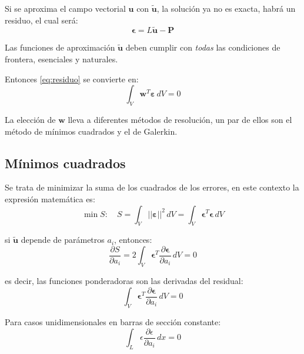 Si se aproxima el campo vectorial $\mathbf{u}$ con $\tilde{\mathbf{u}}$, la solución ya no es exacta, habrá un residuo, el cual será:
\begin{equation}
	\bm{\epsilon} = L \tilde{\mathbf{u}} - \mathbf{P}
\end{equation}

Las funciones de aproximación $\tilde{\mathbf{u}}$ deben cumplir con \textit{todas} las condiciones de frontera, esenciales y naturales.

Entonces \eqref{eq:residuo} se convierte en:
\begin{equation}
	\int_V \mathbf{w}^T \bm{\varepsilon} \, dV = 0
	\label{eq:pond}
\end{equation}

La elección de $\mathbf{w}$ lleva a diferentes métodos de resolución, un par de ellos son el método de mínimos cuadrados y el de Galerkin.

\subsection{Mínimos cuadrados}
Se trata de minimizar la suma de los cuadrados de los errores, en este contexto la expresión matemática es:
\begin{equation}
	\min S: \quad S = \int_V ||\bm{\varepsilon}||^2 \, dV =  \int_V \bm{\epsilon}^T \bm{\epsilon} \, dV
\end{equation}

si $\tilde{\mathbf{u}}$ depende de parámetros $a_i$, entonces:
\begin{equation}
	\dfrac{\partial S}{\partial a_i} = 2 \int_V \bm{\epsilon}^T \dfrac{\partial \bm{\epsilon}}{\partial a_i} \, dV = 0
\end{equation}

es decir, las funciones ponderadoras son las derivadas del residual:
\begin{equation}
	\boxed{\int_V \bm{\epsilon}^T \dfrac{\partial \bm{\epsilon}}{\partial a_i} \, dV = 0}
\end{equation}

Para casos unidimensionales en barras de sección constante:
\begin{equation}
	\int_L \epsilon \dfrac{\partial \epsilon}{\partial a_i} \, dx = 0
	\label{eq:min2}
\end{equation}

